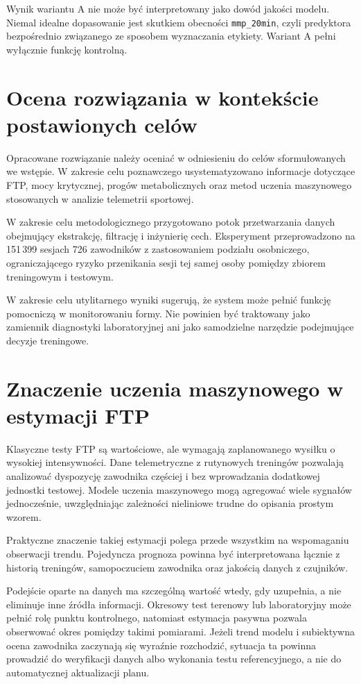Wynik wariantu A nie może być interpretowany jako dowód jakości modelu. Niemal idealne dopasowanie jest skutkiem obecności \texttt{mmp\_20min}, czyli predyktora bezpośrednio związanego ze sposobem wyznaczania etykiety. Wariant A pełni wyłącznie funkcję kontrolną.

\section{Ocena rozwiązania w kontekście postawionych celów}

Opracowane rozwiązanie należy oceniać w odniesieniu do celów sformułowanych we wstępie. W zakresie celu poznawczego usystematyzowano informacje dotyczące FTP, mocy krytycznej, progów metabolicznych oraz metod uczenia maszynowego stosowanych w analizie telemetrii sportowej.

W zakresie celu metodologicznego przygotowano potok przetwarzania danych obejmujący ekstrakcję, filtrację i inżynierię cech. Eksperyment przeprowadzono na 151\,399 sesjach 726 zawodników z zastosowaniem podziału osobniczego, ograniczającego ryzyko przenikania sesji tej samej osoby pomiędzy zbiorem treningowym i testowym.

W zakresie celu utylitarnego wyniki sugerują, że system może pełnić funkcję pomocniczą w monitorowaniu formy. Nie powinien być traktowany jako zamiennik diagnostyki laboratoryjnej ani jako samodzielne narzędzie podejmujące decyzje treningowe.

\section{Znaczenie uczenia maszynowego w estymacji FTP}

Klasyczne testy FTP są wartościowe, ale wymagają zaplanowanego wysiłku o wysokiej intensywności. Dane telemetryczne z rutynowych treningów pozwalają analizować dyspozycję zawodnika częściej i bez wprowadzania dodatkowej jednostki testowej. Modele uczenia maszynowego mogą agregować wiele sygnałów jednocześnie, uwzględniając zależności nieliniowe trudne do opisania prostym wzorem.

Praktyczne znaczenie takiej estymacji polega przede wszystkim na wspomaganiu obserwacji trendu. Pojedyncza prognoza powinna być interpretowana łącznie z historią treningów, samopoczuciem zawodnika oraz jakością danych z czujników.

Podejście oparte na danych ma szczególną wartość wtedy, gdy uzupełnia, a nie eliminuje inne źródła informacji. Okresowy test terenowy lub laboratoryjny może pełnić rolę punktu kontrolnego, natomiast estymacja pasywna pozwala obserwować okres pomiędzy takimi pomiarami. Jeżeli trend modelu i subiektywna ocena zawodnika zaczynają się wyraźnie rozchodzić, sytuacja ta powinna prowadzić do weryfikacji danych albo wykonania testu referencyjnego, a nie do automatycznej aktualizacji planu.

